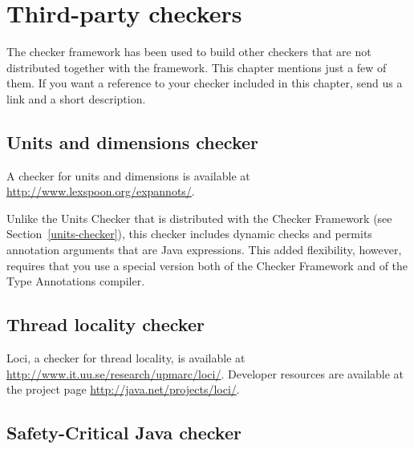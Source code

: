 \htmlhr
\chapter{Third-party checkers\label{third-party-checkers}\label{external-checkers}}

The checker framework has been used to build other checkers that are not
distributed together with the framework.  This chapter mentions just a few
of them.
If you want a reference to your checker included in this chapter,
send us a link and a short description.


\section{Units and dimensions checker\label{units-and-dimensions-checker}}

A checker for units and dimensions is available at
\url{http://www.lexspoon.org/expannots/}.

Unlike the Units Checker that is distributed with the Checker Framework
(see Section~\ref{units-checker}), this checker includes dynamic checks and
permits annotation arguments that are Java expressions.  This added
flexibility, however, requires that you use a special version both of the
Checker Framework and of the Type Annotations compiler.


\section{Thread locality checker\label{loci-thread-locality-checker}}

Loci, a checker for thread locality, is available at
\url{http://www.it.uu.se/research/upmarc/loci/}.
Developer resources are available at the project page
\url{http://java.net/projects/loci/}.







\section{Safety-Critical Java checker\label{safety-critical-java-checker}}

